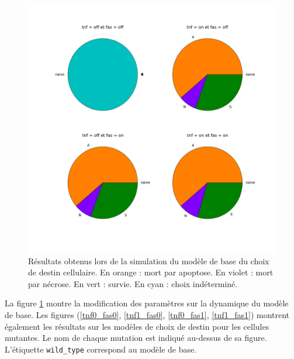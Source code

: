 \documentclass[11pt, a4paper]{article}
\begin{document}
\begin{figure}[position]
    \begin{center}
        \includegraphics[scale=0.27]{result_fadd}
        \caption{
            \label{result_fadd}
            Résultats obtenus lors de la simulation du modèle de base du choix
            de destin cellulaire. En orange : mort par apoptose. En violet :
            mort par nécrose. En vert : survie. En cyan : choix indéterminé.
        }
    \end{center}
\end{figure}

La figure \ref{result_fadd} montre la modification des paramètres sur la
dynamique du modèle de base. Les figures (\ref{tnf0_fas0}, \ref{tnf1_fas0},
\ref{tnf0_fas1}, \ref{tnf1_fas1}) montrent également les résultats sur les
modèles de choix de destin pour les cellules mutantes. Le nom de chaque
mutation est indiqué au-dessus de sa figure. L'étiquette \texttt{wild\_type}
correspond au modèle de base.
\end{document}
